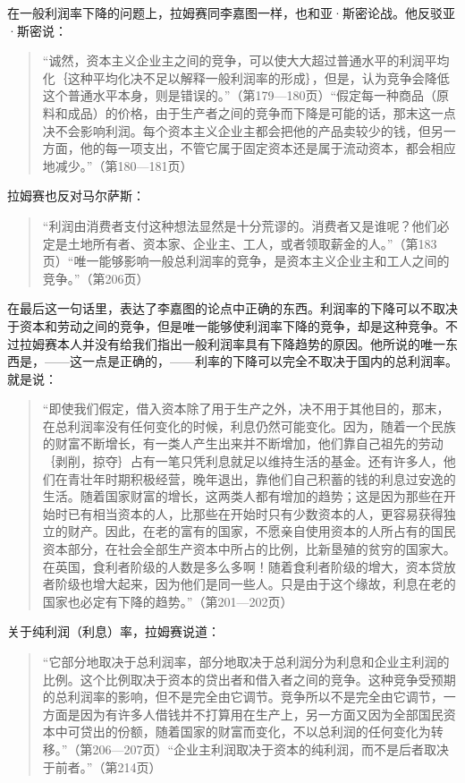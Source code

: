 在一般利润率下降的问题上，拉姆赛同李嘉图一样，也和亚·斯密论战。他反驳亚·斯密说：

\begin{quote}{“诚然，资本主义企业主之间的竞争，可以使大大超过普通水平的利润平均化｛这种平均化决不足以解释一般利润率的形成｝，但是，认为竞争会降低这个普通水平本身，则是错误的。”（第179—180页）“假定每一种商品（原料和成品）的价格，由于生产者之间的竞争而下降是可能的话，那末这一点决不会影响利润。每个资本主义企业主都会把他的产品卖较少的钱，但另一方面，他的每一项支出，不管它属于固定资本还是属于流动资本，都会相应地减少。”（第180—181页）}\end{quote}

拉姆赛也反对马尔萨斯：

\begin{quote}{“利润由消费者支付这种想法显然是十分荒谬的。消费者又是谁呢？他们必定是土地所有者、资本家、企业主、工人，或者领取薪金的人。”（第183页）“唯一能够影响一般总利润率的竞争，是资本主义企业主和工人之间的竞争。”（第206页）}\end{quote}

在最后这一句话里，表达了李嘉图的论点中正确的东西。利润率的下降可以不取决于资本和劳动之间的竞争，但是唯一能够使利润率下降的竞争，却是这种竞争。不过拉姆赛本人并没有给我们指出一般利润率具有下降趋势的原因。他所说的唯一东西是，——这一点是正确的，——利率的下降可以完全不取决于国内的总利润率。就是说：

\begin{quote}{“即使我们假定，借入资本除了用于生产之外，决不用于其他目的，那末，在总利润率没有任何变化的时候，利息仍然可能变化。因为，随着一个民族的财富不断增长，有一类人产生出来并不断增加，他们靠自己祖先的劳动｛剥削，掠夺｝占有一笔只凭利息就足以维持生活的基金。还有许多人，他们在青壮年时期积极经营，晚年退出，靠他们自己积蓄的钱的利息过安逸的生活。随着国家财富的增长，这两类人都有增加的趋势；这是因为那些在开始时已有相当资本的人，比那些在开始时只有少数资本的人，更容易获得独立的财产。因此，在老的富有的国家，不愿亲自使用资本的人所占有的国民资本部分，在社会全部生产资本中所占的比例，比新垦殖的贫穷的国家大。在英国，食利者阶级的人数是多么多啊！随着食利者阶级的增大，资本贷放者阶级也增大起来，因为他们是同一些人。只是由于这个缘故，利息在老的国家也必定有下降的趋势。”（第201—202页）}\end{quote}

关于纯利润（利息）率，拉姆赛说道：

\begin{quote}{“它部分地取决于总利润率，部分地取决于总利润分为利息和企业主利润的比例。这个比例取决于资本的贷出者和借入者之间的竞争。这种竞争受预期的总利润率的影响，但不是完全由它调节。竞争所以不是完全由它调节，一方面是因为有许多人借钱并不打算用在生产上，另一方面又因为全部国民资本中可贷出的份额，随着国家的财富而变化，不以总利润的任何变化为转移。”（第206—207页）“企业主利润取决于资本的纯利润，而不是后者取决于前者。”（第214页）}\end{quote}

